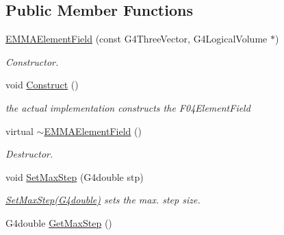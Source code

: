 \subsection*{Public Member Functions}
\begin{DoxyCompactItemize}
\item 
\hypertarget{classEMMAElementField_add98f76bf86d66edd4f94119c20e95e5}{\hyperlink{classEMMAElementField_add98f76bf86d66edd4f94119c20e95e5}{E\-M\-M\-A\-Element\-Field} (const G4\-Three\-Vector, G4\-Logical\-Volume $\ast$)}\label{classEMMAElementField_add98f76bf86d66edd4f94119c20e95e5}

\begin{DoxyCompactList}\small\item\em Constructor. \end{DoxyCompactList}\item 
\hypertarget{classEMMAElementField_ac9fc590e35ae0a7a81253de6a3271379}{void \hyperlink{classEMMAElementField_ac9fc590e35ae0a7a81253de6a3271379}{Construct} ()}\label{classEMMAElementField_ac9fc590e35ae0a7a81253de6a3271379}

\begin{DoxyCompactList}\small\item\em the actual implementation constructs the F04\-Element\-Field \end{DoxyCompactList}\item 
\hypertarget{classEMMAElementField_afda9d839a3caadc03a68a603f8c64d1a}{virtual \hyperlink{classEMMAElementField_afda9d839a3caadc03a68a603f8c64d1a}{$\sim$\-E\-M\-M\-A\-Element\-Field} ()}\label{classEMMAElementField_afda9d839a3caadc03a68a603f8c64d1a}

\begin{DoxyCompactList}\small\item\em Destructor. \end{DoxyCompactList}\item 
\hypertarget{classEMMAElementField_ac77a8d456ddba267a86c37577b6d8237}{void \hyperlink{classEMMAElementField_ac77a8d456ddba267a86c37577b6d8237}{Set\-Max\-Step} (G4double stp)}\label{classEMMAElementField_ac77a8d456ddba267a86c37577b6d8237}

\begin{DoxyCompactList}\small\item\em \hyperlink{classEMMAElementField_ac77a8d456ddba267a86c37577b6d8237}{Set\-Max\-Step(\-G4double)} sets the max. step size. \end{DoxyCompactList}\item 
\hypertarget{classEMMAElementField_ad3dc48616b3869104b10dc1007b6c95e}{G4double \hyperlink{classEMMAElementField_ad3dc48616b3869104b10dc1007b6c95e}{Get\-Max\-Step} ()}\label{classEMMAElementField_ad3dc48616b3869104b10dc1007b6c95e}


\end{DoxyCompactItemize}
